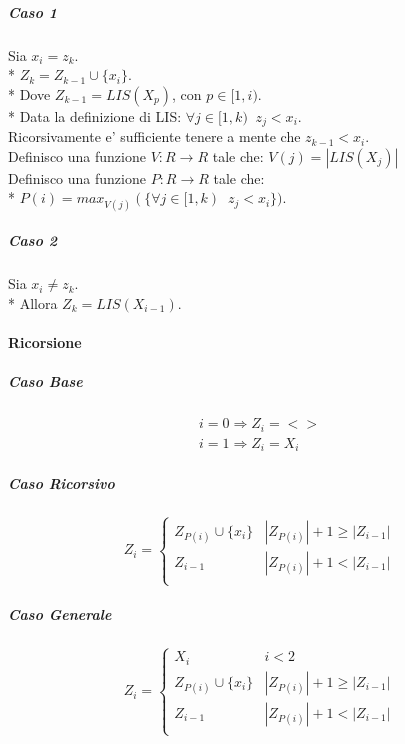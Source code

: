 \subparagraph{Caso 1}

Sia $x_i = z_k$. \\*
$Z_k = Z_{k-1} \cup \{x_i\}$. \\*
Dove $Z_{k-1} = LIS(X_p)$, con $p \in [1, i)$. \\*
Data la definizione di LIS: $\forall j \in [1, k) \;\; z_{j} < x_i$. \\
Ricorsivamente e' sufficiente tenere a mente che $z_{k-1} < x_i$. \\

Definisco una funzione $V : R \rightarrow R$ tale che: $V(j) = |LIS(X_j)|$ \\

Definisco una funzione $P : R \rightarrow R$ tale che: \\*
$P(i) = max_{V(j)}(\{ \forall j \in [1, k) \;\; z_{j} < x_i \})$.

\subparagraph{Caso 2}

Sia $x_i \ne z_k$. \\*
Allora $Z_k = LIS(X_{i-1})$. \\

\paragraph{Ricorsione}

\subparagraph{Caso Base}

\begin{align}
    \text{$i = 0 \Rightarrow Z_i = <>$} \\
    \text{$i = 1 \Rightarrow Z_i = X_i$}
\end{align}

\subparagraph{Caso Ricorsivo}

\[
    Z_i =
    \begin{cases}
        \text{$Z_{P(i)} \cup \{x_i\}$} & \text{$|Z_{P(i)}| + 1 \geq |Z_{i-1}|$} \\
        \text{$Z_{i-1}$} & \text{$|Z_{P(i)}| + 1 < |Z_{i-1}|$} \\
    \end{cases}
\]


\subparagraph{Caso Generale}

\[
    Z_i =
    \begin{cases}
        \text{$X_i$} & \text{$i < 2$} \\
        \text{$Z_{P(i)} \cup \{x_i\}$} & \text{$|Z_{P(i)}| + 1 \geq |Z_{i-1}|$} \\
        \text{$Z_{i-1}$} & \text{$|Z_{P(i)}| + 1 < |Z_{i-1}|$} \\
    \end{cases}
\]

